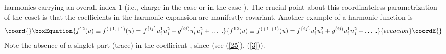 \documentclass[a4paper,12pt]{article}
\begin{document}
harmonics carrying an overall index 1 (i.e., charge \coordHE{} in the 
case \coordHE{} or \coordHE{} in the case \coordHE{}). The crucial point about this coordinateless 
parametrization of the coset is that the coefficients in the 
harmonic expansion are manifestly \coordHE{} covariant. 
Another example of a \coordHE{} harmonic function is 
\begin{equation}\coord{}\boxEquation{\label{30'}
  f^{12}(u)\equiv f^{(+1,+1)}(u)  = f^{\{ij\}}u^1_iu^2_j +  
g^{(ij)}u^1_iu^2_j +\ldots\;.
}{f^{12}(u)\equiv f^{(+1,+1)}(u)  = f^{\{ij\}}u^1_iu^2_j +  
g^{(ij)}u^1_iu^2_j +\ldots\;.
}{ecuacion}\coordE{}\end{equation}
Note the absence of a singlet part (trace) in the coefficient 
\coordHE{}, since \coordHE{} (see (\ref{25}), 
(\ref{3})). 
\end{document}
